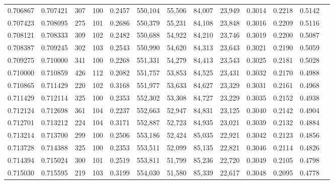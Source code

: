 \begin{tabular}{rrrrrrrrrrrrr}
0.706867 & 0.707421 &    307 &   100 &                                     0.2457 & 550,104 &  55,506 &  84,007 &  23,949 & 0.3014 & 0.2218 & 0.5142 \\
0.707423 & 0.708095 &    275 &   101 &                                     0.2686 & 550,379 &  55,231 &  84,108 &  23,848 & 0.3016 & 0.2209 & 0.5116 \\
0.708121 & 0.708333 &    309 &   102 &                                     0.2482 & 550,688 &  54,922 &  84,210 &  23,746 & 0.3019 & 0.2200 & 0.5087 \\
0.708387 & 0.709245 &    302 &   103 &                                     0.2543 & 550,990 &  54,620 &  84,313 &  23,643 & 0.3021 & 0.2190 & 0.5059 \\
0.709275 & 0.710000 &    341 &   100 &                                     0.2268 & 551,331 &  54,279 &  84,413 &  23,543 & 0.3025 & 0.2181 & 0.5028 \\
0.710000 & 0.710859 &    426 &   112 &                                     0.2082 & 551,757 &  53,853 &  84,525 &  23,431 & 0.3032 & 0.2170 & 0.4988 \\
0.710865 & 0.711429 &    220 &   102 &                                     0.3168 & 551,977 &  53,633 &  84,627 &  23,329 & 0.3031 & 0.2161 & 0.4968 \\
0.711429 & 0.712114 &    325 &   100 &                                     0.2353 & 552,302 &  53,308 &  84,727 &  23,229 & 0.3035 & 0.2152 & 0.4938 \\
0.712124 & 0.712698 &    361 &   104 &                                     0.2237 & 552,663 &  52,947 &  84,831 &  23,125 & 0.3040 & 0.2142 & 0.4904 \\
0.712701 & 0.713212 &    224 &   104 &                                     0.3171 & 552,887 &  52,723 &  84,935 &  23,021 & 0.3039 & 0.2132 & 0.4884 \\
0.713214 & 0.713700 &    299 &   100 &                                     0.2506 & 553,186 &  52,424 &  85,035 &  22,921 & 0.3042 & 0.2123 & 0.4856 \\
0.713728 & 0.714388 &    325 &   100 &                                     0.2353 & 553,511 &  52,099 &  85,135 &  22,821 & 0.3046 & 0.2114 & 0.4826 \\
0.714394 & 0.715024 &    300 &   101 &                                     0.2519 & 553,811 &  51,799 &  85,236 &  22,720 & 0.3049 & 0.2105 & 0.4798 \\
0.715030 & 0.715595 &    219 &   103 &                                     0.3199 & 554,030 &  51,580 &  85,339 &  22,617 & 0.3048 & 0.2095 & 0.4778 \\

\end{tabular}
